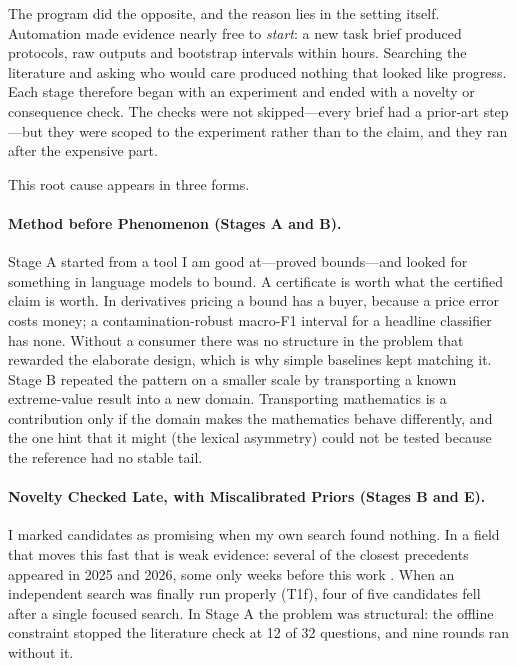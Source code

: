 \documentclass[11pt]{article}
\begin{document}
The program did the opposite, and the reason lies in the setting itself. Automation made evidence nearly free to \emph{start}: a new task brief produced protocols, raw outputs and bootstrap intervals within hours. Searching the literature and asking who would care produced nothing that looked like progress. Each stage therefore began with an experiment and ended with a novelty or consequence check. The checks were not skipped---every brief had a prior-art step---but they were scoped to the experiment rather than to the claim, and they ran after the expensive part.

This root cause appears in three forms.

\paragraph{Method before Phenomenon (Stages A and B).} Stage A started from a tool I am good at---proved bounds---and looked for something in language models to bound. A certificate is worth what the certified claim is worth. In derivatives pricing a bound has a buyer, because a price error costs money; a contamination-robust macro-F1 interval for a headline classifier has none. Without a consumer there was no structure in the problem that rewarded the elaborate design, which is why simple baselines kept matching it. Stage B repeated the pattern on a smaller scale by transporting a known extreme-value result into a new domain. Transporting mathematics is a contribution only if the domain makes the mathematics behave differently, and the one hint that it might (the lexical asymmetry) could not be tested because the reference had no stable tail.

\paragraph{Novelty Checked Late, with Miscalibrated Priors (Stages B and E).} I marked candidates as promising when my own search found nothing. In a field that moves this fast that is weak evidence: several of the closest precedents appeared in 2025 and 2026, some only weeks before this work \citep{marks2026psychophysics,finesse2026,yan2026training,envcommons2026pr4}. When an independent search was finally run properly (T1f), four of five candidates fell after a single focused search. In Stage A the problem was structural: the offline constraint stopped the literature check at 12 of 32 questions, and nine rounds ran without it.
\end{document}
